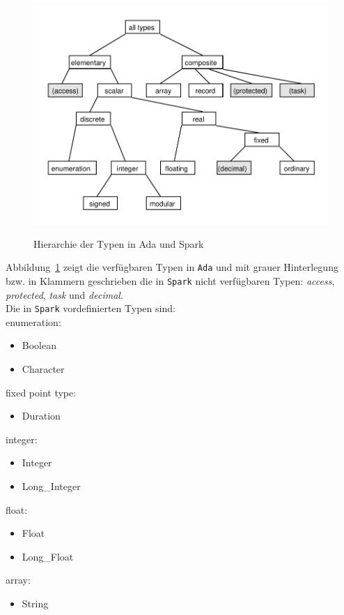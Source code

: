 \begin{figure}[h!]
\includegraphics[width=\textwidth{}]{images/typeHierarchy.pdf}
\label{fig:typeHierarchy}
\caption{Hierarchie der Typen in Ada und Spark}
\end{figure}

Abbildung~\ref{fig:typeHierarchy} zeigt die verfügbaren Typen in \texttt{Ada} und mit grauer Hinterlegung bzw. in Klammern geschrieben die in \texttt{Spark} nicht verfügbaren Typen: \textit{access}, \textit{protected}, \textit{task} und \textit{decimal}.\\
Die in \texttt{Spark} vordefinierten Typen sind:\\
enumeration:
\begin{itemize}
	\item Boolean
	\item Character
\end{itemize}
fixed point type:
\begin{itemize}
	\item Duration
\end{itemize}
integer:
\begin{itemize}
	\item Integer
	\item Long\_Integer
\end{itemize}
float:
\begin{itemize}
	\item Float
	\item Long\_Float
\end{itemize}
array:
\begin{itemize}
	\item String
\end{itemize}

